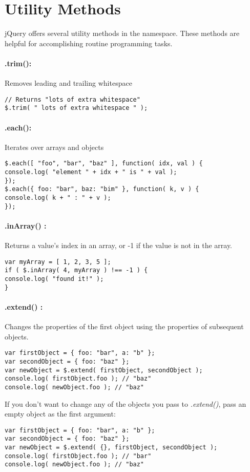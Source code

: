 \documentclass[10pt,letterpaper]{book}
\begin{document}
\section{Utility Methods}
jQuery offers several utility methods in the \textdollar  namespace. These methods are helpful for accomplishing routine programming tasks.

\paragraph{\textdollar.trim():} Removes leading and trailing whitespace
\begin{lstlisting}
// Returns "lots of extra whitespace"
$.trim( " lots of extra whitespace " );
\end{lstlisting}
\paragraph{\textdollar.each():} Iterates over arrays and objects
\begin{lstlisting}
$.each([ "foo", "bar", "baz" ], function( idx, val ) {
console.log( "element " + idx + " is " + val );
});
$.each({ foo: "bar", baz: "bim" }, function( k, v ) {
console.log( k + " : " + v );
});
\end{lstlisting}
\paragraph{\textdollar.inArray() :} Returns a value's index in an array, or -1 if the value is not in the array.
\begin{lstlisting}
var myArray = [ 1, 2, 3, 5 ];
if ( $.inArray( 4, myArray ) !== -1 ) {
console.log( "found it!" );
}
\end{lstlisting}
\paragraph{\textdollar.extend() :} Changes the properties of the first object using the properties of subsequent objects.
\begin{lstlisting}
var firstObject = { foo: "bar", a: "b" };
var secondObject = { foo: "baz" };
var newObject = $.extend( firstObject, secondObject );
console.log( firstObject.foo ); // "baz"
console.log( newObject.foo ); // "baz"
\end{lstlisting}
If you don't want to change any of the objects you pass to \textit{\textdollar.extend()}, pass an empty object as the first argument:
\begin{lstlisting}
var firstObject = { foo: "bar", a: "b" };
var secondObject = { foo: "baz" };
var newObject = $.extend( {}, firstObject, secondObject );
console.log( firstObject.foo ); // "bar"
console.log( newObject.foo ); // "baz"
\end{lstlisting}
\end{document}
